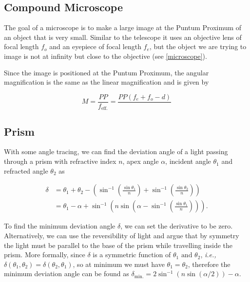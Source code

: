 \documentclass[english,a4paper,12pt]{report}
\begin{document}
\subsection{Compound Microscope}

The goal of a microscope is to make a large image at the Puntum Proximum of an object that is very small. Similar to the telescope it uses an objective lens of focal length \(f_{o} \) and an eyepiece of focal length \(f_{e} \), but the object we are trying to image is not at infinity but close to the objective (see \cref{microscope}).

Since the image is positioned at the Puntum Proximum, the angular magnification is the same as the linear magnification and is given by 

\begin{equation}
    M = \frac{PP}{f_{\text{eff.} } } = \frac{PP(f_{e} + f_{o} - d  )}{} 
\end{equation}




\subsection{Prism}

With some angle tracing, we can find the deviation angle of a light passing through a prism with refractive index \(n\), apex angle \(\alpha \), incident angle \(\theta _{1} \) and refracted angle \(\theta _{2} \)  as 

\begin{equation}
    \begin{aligned} 
    \delta &= \theta _{1} + \theta _{2} - \left( \sin ^{-1} \left( \frac{\sin \theta _{1} }{n}  \right) + \sin ^{-1} \left( \frac{\sin \theta _{2} }{n}  \right)\right) \\
    &= \theta _{1} - \alpha + \sin ^{-1} \left( n\sin \left( \alpha - \sin ^{-1} \left( \frac{\sin \theta _{1} }{n}  \right) \right) \right). 
    \end{aligned} 
\end{equation}

To find the minimum deviation angle \(\delta \), we can set the derivative to be zero. Alternatively, we can use the reversibility of light and argue that by symmetry the light must be parallel to the base of the prism while travelling inside the prism. More formally, since \(\delta \) is a symmetric function of \(\theta _{1} \text { and } \theta _{2}  \), \textit{i.e.,} \(\delta (\theta _{1}, \theta _{2}  ) = \delta (\theta _{2}, \theta _{1}  )\), so at minimum we must have \(\theta _{1} = \theta _{2}  \), therefore the minimum deviation angle can be found as \(\delta _{\text{min.} } = 2 \sin ^{-1} (n \sin (\alpha /2)) - \alpha  \). 
\end{document}
